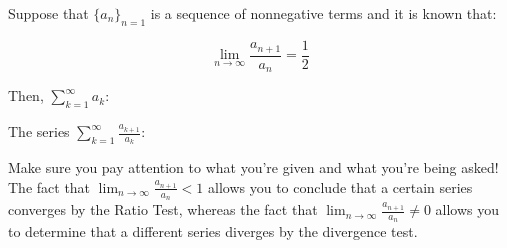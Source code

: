 \documentclass{ximera}
\author{Jim Talamo}
\begin{document}
\begin{exercise}
Suppose that $\{a_n\}_{n=1}$ is a sequence of nonnegative terms and it is known that:

\[
\lim_{n \to \infty} \frac{a_{n+1}}{a_n} = \frac{1}{2}
\]

Then, $\sum_{k=1}^{\infty} a_k$:
\begin{multipleChoice}
\end{multipleChoice}

The series $\sum_{k=1}^{\infty} \frac{a_{k+1}}{a_k}$:
\begin{multipleChoice}
\end{multipleChoice}

\begin{hint}
Make sure you pay attention to what you're given and what you're being asked!  The fact that $\lim_{n \to \infty} \frac{a_{n+1}}{a_n} <1$ allows you to conclude that a certain series converges by the Ratio Test, whereas the fact that $\lim_{n \to \infty} \frac{a_{n+1}}{a_n} \neq 0 $ allows you to determine that a different series diverges by the divergence test.
\end{hint}
\end{exercise}
\end{document}
